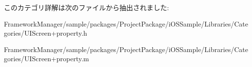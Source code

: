 このカテゴリ詳解は次のファイルから抽出されました\+:\begin{DoxyCompactItemize}
\item 
Framework\+Manager/sample/packages/\+Project\+Package/i\+O\+S\+Sample/\+Libraries/\+Categories/U\+I\+Screen+property.\+h\item 
Framework\+Manager/sample/packages/\+Project\+Package/i\+O\+S\+Sample/\+Libraries/\+Categories/U\+I\+Screen+property.\+m\end{DoxyCompactItemize}

